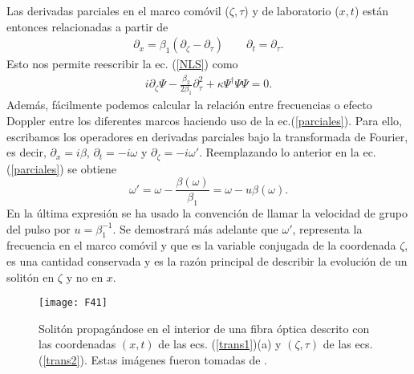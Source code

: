 Las derivadas parciales en el marco com\'{o}vil ($\zeta,\tau$) y de laboratorio ($x,t$) est\'{a}n entonces relacionadas a partir de
\begin{align}\label{parciales}
\partial_x=\beta_1(\partial_{\zeta}-\partial_{\tau})\qquad
\partial_t=\partial_{\tau}.
\end{align}
Esto nos permite reescribir la ec. (\ref{NLS}) como
\begin{align}
i\partial_{\zeta}\Psi-\frac{\beta_2}{2\beta_1}\partial_{\tau}^2+\kappa\Psi^{\dagger}\Psi \Psi=0.
\end{align}
Adem\'{a}s, f\'{a}cilmente podemos calcular la relaci\'{o}n entre frecuencias o efecto Doppler entre los diferentes marcos haciendo uso de la ec.(\ref{parciales}). Para ello, escribamos los operadores en derivadas parciales bajo la transformada de  Fourier, es decir, $\partial_x=i\beta$, $\partial_{t}=-i\omega$ y $\partial_{\zeta}=-i\omega'$. Reemplazando lo anterior en la ec. (\ref{parciales}) se obtiene
\begin{equation}\label{ec:doppler}
\omega'=\omega-\frac{\beta(\omega)}{\beta_1}=\omega-u\beta(\omega).
\end{equation}
En la \'{u}ltima expresi\'{o}n se ha usado la convenci\'{o}n de llamar la velocidad de grupo del pulso por $u=\beta_1^{-1}$. Se demostrar\'{a} m\'{a}s adelante que $\omega'$, representa la frecuencia en el marco com\'{o}vil y que es la variable conjugada de la coordenada $\zeta$, es una cantidad conservada y es la raz\'{o}n principal de describir la evoluci\'{o}n de un solit\'{o}n en $\zeta$ y no en $x.$
\begin{figure}\centering
	\texttt{[image: F41]}
	\caption{Solit\'{o}n propag\'andose en el interior de una fibra óptica descrito con las coordenadas $(x,t)$  de las ecs. (\ref{trans1})(a) y $(\zeta,\tau)$ de las ecs. (\ref{trans2}). Estas im\'agenes fueron tomadas de \citep{Robertson2011}.}\label{fig:4.1}
\end{figure}


